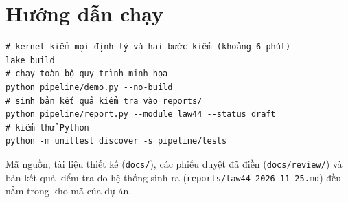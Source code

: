 \documentclass[12pt,a4paper]{article}
\newcommand{\code}[1]{\texttt{#1}}
\begin{document}
\appendix
\section{Hướng dẫn chạy}

\begin{Verbatim}
# kernel kiểm mọi định lý và hai bước kiểm (khoảng 6 phút)
lake build
# chạy toàn bộ quy trình minh họa
python pipeline/demo.py --no-build
# sinh bản kết quả kiểm tra vào reports/
python pipeline/report.py --module law44 --status draft
# kiểm thử Python
python -m unittest discover -s pipeline/tests
\end{Verbatim}

Mã nguồn, tài liệu thiết kế (\code{docs/}), các phiếu duyệt đã điền (\code{docs/review/}) và bản kết quả kiểm tra do hệ thống sinh ra
(\code{reports/law44-2026-11-25.md}) đều nằm trong kho mã của dự án.
\end{document}

